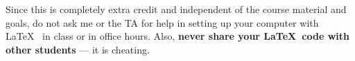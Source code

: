 \documentclass[12pt]{article}
\newcommand{\qu}[1]{``#1''}
\begin{document}
Since this is completely extra credit and independent of the course material and goals, do not ask me or the TA for help in setting up your computer with \LaTeX~ in class or in office hours. Also, \textbf{never share your \LaTeX~code with other students} --- it is cheating.

%

%
%
%
%
%
%
%
%
\end{document}
